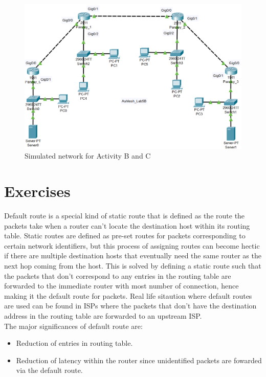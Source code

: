 \documentclass{lab_sheet}
\begin{document}
    \begin{figure}[H]
      \centering
      \includegraphics[scale=.6]{Figures/activityb.png}
      \caption{Simulated network for Activity B and C}
      \label{fig:activityb}
  \end{figure}


    \section{Exercises}
    Default route is a special kind of static route that is defined as the route the packets take when a router can't locate the destination host within its routing table. Static routes are defined as pre-set routes for packets corresponding to certain network identifiers, but this process of assigning routes can become hectic if there are multiple destination hosts that eventually need the same router as the next hop coming from the host. This is solved by defining a static route such that the packets that don't correspond to any entries in the routing table are forwarded to the immediate router with most number of connection, hence making it the default route for packets. Real life sitaution where default routes are used can be found in ISPs where the packets that don't have the destination address in the routing table are forwarded to an upstream ISP.\\
    The major significances of default route are:
    \begin{itemize}
      \item Reduction of entries in routing table.
      \item Reduction of latency within the router since unidentified packets are fowarded via the default route.
    \end{itemize}
    
\end{document}
